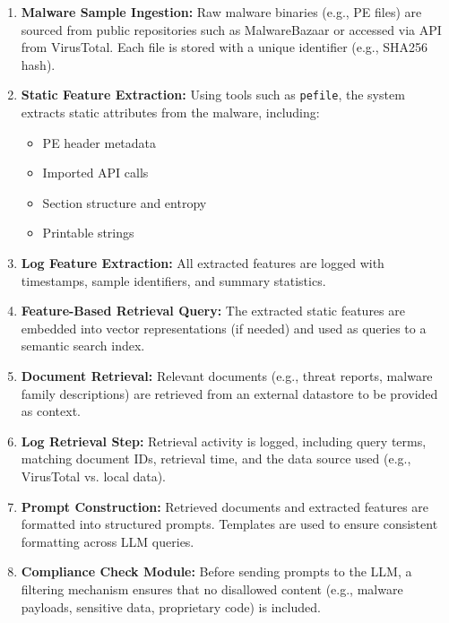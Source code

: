 \begin{enumerate}
    \item \textbf{Malware Sample Ingestion:} Raw malware binaries (e.g., PE files) are sourced from public repositories such as MalwareBazaar or accessed via API from VirusTotal. Each file is stored with a unique identifier (e.g., SHA256 hash).

    \item \textbf{Static Feature Extraction:} Using tools such as \texttt{pefile}, the system extracts static attributes from the malware, including:
          \begin{itemize}
              \item PE header metadata
              \item Imported API calls
              \item Section structure and entropy
              \item Printable strings
          \end{itemize}

    \item \textbf{Log Feature Extraction:} All extracted features are logged with timestamps, sample identifiers, and summary statistics.

    \item \textbf{Feature-Based Retrieval Query:} The extracted static features are embedded into vector representations (if needed) and used as queries to a semantic search index.

    \item \textbf{Document Retrieval:} Relevant documents (e.g., threat reports,
          malware family descriptions) are retrieved from an external datastore to be
          provided as context.

    \item \textbf{Log Retrieval Step:} Retrieval activity is logged, including query terms, matching document IDs, retrieval time, and the data source used (e.g., VirusTotal vs. local data).

    \item \textbf{Prompt Construction:} Retrieved documents and extracted features are formatted into structured prompts. Templates are used to ensure consistent formatting across LLM queries.

    \item \textbf{Compliance Check Module:} Before sending prompts to the LLM, a filtering mechanism ensures that no disallowed content (e.g., malware payloads, sensitive data, proprietary code) is included.


\end{enumerate}

